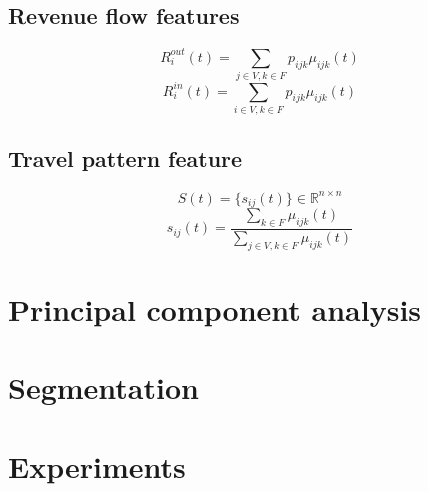 \documentclass[a4paper,oneside]{article}
\begin{document}
\subsection{Revenue flow features} 
$$
R_{i}^{out}(t) = \sum_{j\in V, k\in F} p_{ijk} \mu_{ijk}(t)
$$
$$
R_{i}^{in}(t) = \sum_{i\in V, k\in F} p_{ijk} \mu_{ijk}(t)
$$


\subsection{Travel pattern feature}
$$
S(t) = \{s_{ij}(t)\} \in \mathbb{R}^{n\times n}
$$
$$
s_{ij}(t) = \frac{\sum_{k\in F}\mu_{ijk}(t)}{\sum_{j\in V, k\in F}\mu_{ijk}(t)}
$$

\section{Principal component analysis}

\section{Segmentation}

\section{Experiments}
\end{document}
